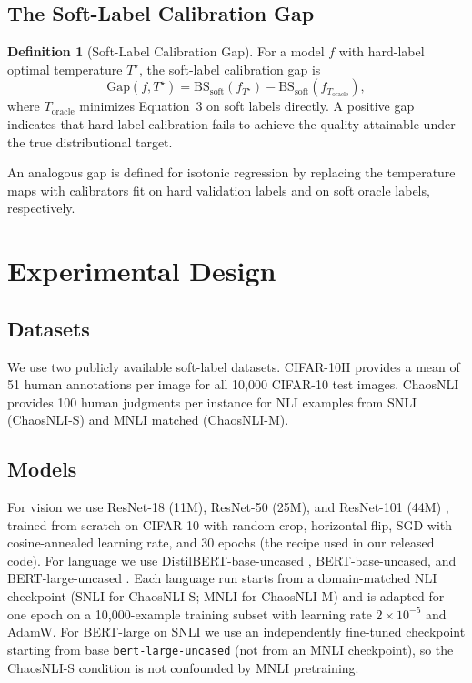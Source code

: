 \documentclass[11pt,a4paper]{article}
\theoremstyle{definition}
\newtheorem{definition}{Definition}
\begin{document}
\subsection{The Soft-Label Calibration Gap}
\label{sec:gap-def}

\begin{definition}[Soft-Label Calibration Gap]
For a model $f$ with hard-label optimal temperature $T^\star$, the
soft-label calibration gap is
\[
\mathrm{Gap}(f,T^\star)
=\mathrm{BS}_{\mathrm{soft}}(f_{T^\star})
-\mathrm{BS}_{\mathrm{soft}}(f_{T_{\mathrm{oracle}}}),
\]
where $T_{\mathrm{oracle}}$ minimizes Equation~3 on soft labels
directly. A positive gap indicates that hard-label calibration fails to
achieve the quality attainable under the true distributional target.
\end{definition}

An analogous gap is defined for isotonic regression by replacing the
temperature maps with calibrators fit on hard validation labels and on
soft oracle labels, respectively.

\section{Experimental Design}

\subsection{Datasets}

We use two publicly available soft-label datasets. CIFAR-10H
\cite{Peterson2019} provides a mean of 51 human annotations per image
for all 10{,}000 CIFAR-10 test images. ChaosNLI \cite{Nie2020} provides
100 human judgments per instance for NLI examples from SNLI
(ChaosNLI-S) and MNLI matched (ChaosNLI-M).

\subsection{Models}

For vision we use ResNet-18 (11M), ResNet-50 (25M), and ResNet-101 (44M)
\cite{He2016}, trained from scratch on CIFAR-10 with random crop,
horizontal flip, SGD with cosine-annealed learning rate, and 30 epochs
(the recipe used in our released code). For language we use
DistilBERT-base-uncased \cite{Sanh2019}, BERT-base-uncased, and
BERT-large-uncased \cite{Devlin2019}. Each language run starts from a
domain-matched NLI checkpoint (SNLI for ChaosNLI-S; MNLI for
ChaosNLI-M) and is adapted for one epoch on a 10{,}000-example training
subset with learning rate $2\times10^{-5}$ and AdamW. For BERT-large on
SNLI we use an independently fine-tuned checkpoint starting from base
\texttt{bert-large-uncased} (not from an MNLI checkpoint), so the
ChaosNLI-S condition is not confounded by MNLI pretraining.
\end{document}
